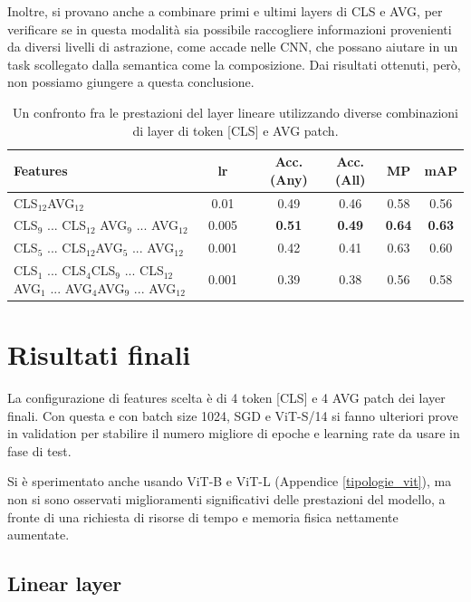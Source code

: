 Inoltre, si provano anche a combinare primi e ultimi layers di CLS e AVG, per verificare se in questa modalità sia possibile raccogliere informazioni provenienti da diversi livelli di astrazione, come accade nelle CNN, che possano aiutare in un task scollegato dalla semantica come la composizione. Dai risultati ottenuti, però, non possiamo giungere a questa conclusione.
\vspace{5mm}
\begin{table}[h]
    \centering
    \setlength{\tabcolsep}{5pt} %
    \renewcommand{\arraystretch}{1.6} %
    \begin{tabular}{m{6.25cm}|c|ccccc}
        \hline
         Features & lr & & \textbf{Acc. (Any)} & \textbf{Acc. (All)} & \textbf{MP} & \textbf{mAP} \\
         \hline
         CLS$_{12}$AVG$_{12}$               & 0.01  & & 0.49 & 0.46 & 0.58 & 0.56 \\
         CLS$_{9}$ ... CLS$_{12}$ AVG$_9$ ... AVG$_{12}$ & 0.005  & & \textbf{0.51} & \textbf{0.49} & \textbf{0.64} & \textbf{0.63} \\
         CLS$_{5}$ ... CLS$_{12}$AVG$_{5}$ ... AVG$_{12}$ & 0.001  & & 0.42 & 0.41 & 0.63 & 0.60 \\
         CLS$_{1}$ ... CLS$_{4}$CLS$_{9}$ ... CLS$_{12}$ AVG$_{1}$ ... AVG$_{4}$AVG$_{9}$ ... AVG$_{12}$ & 0.001 && 0.39 & 0.38 & 0.56 & 0.58 \\
         \hline
    \end{tabular}
    \caption{Un confronto fra le prestazioni del layer lineare utilizzando diverse combinazioni di layer di token [CLS] e AVG patch.}
    \label{tab:cls_avg_prove}
\end{table}


\section{Risultati finali}
La configurazione di features scelta è di 4 token [CLS] e 4 AVG patch dei layer finali. Con questa e con batch size 1024, SGD e ViT-S/14 si fanno ulteriori prove in validation per stabilire il numero migliore di epoche e learning rate da usare in fase di test.

Si è sperimentato anche usando ViT-B e ViT-L (Appendice \ref{tipologie_vit}), ma non si sono osservati miglioramenti significativi delle prestazioni del modello, a fronte di una richiesta di risorse di tempo e memoria fisica nettamente aumentate. 

\subsection{Linear layer}

